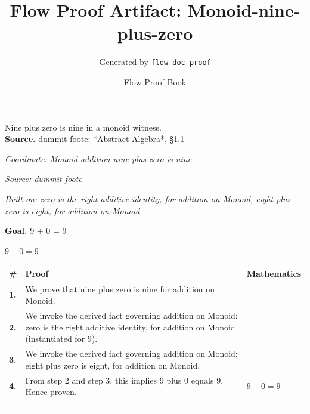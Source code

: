 \documentclass[11pt]{article}
\title{Flow Proof Artifact: Monoid-nine-plus-zero}
\author{Generated by \texttt{flow doc proof}}
\date{Flow Proof Book}
\theoremstyle{definition}
\begin{document}
\maketitle
Nine plus zero is nine in a monoid witness.\\[0.5em]
\textbf{Source.} dummit-foote: *Abstract Algebra*, §1.1\\[0.5em]
\bigskip
{}\par
\smallskip\noindent\textit{Coordinate: Monoid \cdot addition \cdot nine plus zero is nine}\par
\smallskip\noindent\textit{Source: dummit-foote}\par
\smallskip\noindent\textit{Built on: zero is the right additive identity, for addition on Monoid, eight plus zero is eight, for addition on Monoid}\par
\medskip
\noindent\textbf{Goal.} 9 + 0 = 9\par
\noindent$\displaystyle 9 + 0 = 9$\par
\medskip
\noindent
\begin{tabular}{@{} >{\raggedright\arraybackslash}p{} >{\raggedright\arraybackslash}p{} >{\raggedleft\arraybackslash}p{} @{}}
\textbf{\#} & \textbf{Proof} & \textbf{Mathematics} \\
\midrule
\textbf{1.} & We prove that nine plus zero is nine for addition on Monoid. & \\[0.45em]
\textbf{2.} & We invoke the derived fact governing addition on Monoid: zero is the right additive identity, for addition on Monoid (instantiated for 9). & \\[0.45em]
\textbf{3.} & We invoke the derived fact governing addition on Monoid: eight plus zero is eight, for addition on Monoid. & \\[0.45em]
\textbf{4.} & From step 2 and step 3, this implies 9 plus 0 equals 9. Hence proven. & $\displaystyle 9 + 0 = 9$ \\[0.45em]
\bottomrule
\end{tabular}
\label{thm:Monoid-addition-nine_plus_zero_is_nine}
\par\medskip\hrule
\end{document}
